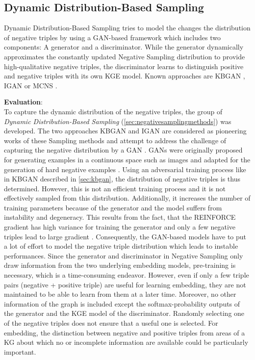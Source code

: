 \subsection{Dynamic Distribution-Based Sampling}
\label{subsec:dynamic_distribution_based_sampling}

Dynamic Distribution-Based Sampling tries to model the changes the distribution of negative triples by using a \ac{GAN}-based framework which includes two components: A generator and a discriminator.
While the generator dynamically approximates the constantly updated Negative Sampling distribution to provide high-qualitative negative triples, 
the discriminator learns to distinguish positive and negative triples with its own \ac{KGE} model.
Known approaches are \ac{KBGAN} \cite{cai2017kbgan}, \ac{IGAN}  \cite{IGAN} or \ac{MCNS} \cite{MCNS}.


\textbf{Evaluation}:\\
To capture the dynamic distribution of the negative triples, the
group of \textit{Dynamic Distribution-Based Sampling} (\autoref{sec:negativesamplingmethods}) was developed.
The two approaches \ac{KBGAN} \cite{cai2017kbgan} and \ac{IGAN} \cite{IGAN} are considered as pioneering works of these Sampling methods and attempt to address the challenge of capturing the negative distribution by a \ac{GAN} \cite{zhang2021efficient}.
\acp{GAN} were originally proposed for generating examples in a continuous space such as images and adapted for the generation of hard negative examples \cite{zhang2021efficient}.
Using an adversarial training process like in \ac{KBGAN} described in \autoref{sec:kbgan}, the distribution of negative triples is thus determined.
However, this is not an efficient training process and it is not effectively sampled from this distribution.
Additionally, it increases the number of training parameters because of the generator and the model suffers from instability and degeneracy.
This results from the fact, that the \textsc{REINFORCE} gradient has high variance for training the generator and only a few negative triples lead to large gradient \cite{zhang2021efficient}.
Consequently, the \ac{GAN}-based models have to put a lot of effort to model the negative triple distribution which leads to instable performances.
Since the generator and discriminator in Negative Sampling only draw information from the two underlying embedding models, pre-training is necessary, which is a time-consuming endeavor.
However, even if only a few triple pairs (negative + positive triple) are useful for learning embedding, they are not maintained to be able to learn from them at a later time.
Moreover, no other information of the graph is included except the softmax-probability outputs of the generator and the \ac{KGE} model of the discriminator.
Randomly selecting one of the negative triples does not ensure that a useful one is selected.
For embedding, the distinction between negative and positive triples from areas of a \ac{KG} about which no or incomplete information are available could be particularly important.


